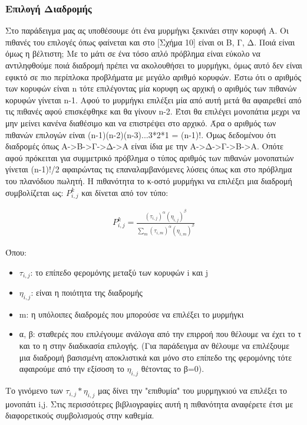 \subsubsection{Επιλογή Διαδρομής}
Στο παράδειγμα μας ας υποθέσουμε ότι ένα μυρμήγκι ξεκινάει στην κορυφή Α. Οι πιθανές του επιλογές όπως φαίνεται και στο [Σχήμα 10] είναι οι Β, Γ, Δ. Ποιά είναι όμως η βέλτιστη; 
Με το μάτι σε ένα τόσο απλό πρόβλημα είναι εύκολο να αντιληφθούμε ποιά διαδρομή πρέπει να ακολουθήσει το μυρμήγκι, όμως αυτό δεν είναι εφικτό σε πιο περίπλοκα προβλήματα με μεγάλο αριθμό κορυφών. Έστω ότι ο αριθμός των κορυφών είναι n τότε επιλέγοντας μία κορυφη ως αρχική ο αριθμός των πιθανών κορυφών γίνεται n-1. Αφού το μυρμήγκι επιλέξει μία από αυτή μετά θα αφαιρεθεί από τις πιθανές αφού επισκέφθηκε και θα γίνουν n-2. Έτσι θα επιλέγει μονοπάτια μεχρι να μην μείνει κανένα διαθέσιμο και να επιστρέψει στο αρχικό. Άρα ο αριθμός των πιθανών επιλογών είναι (n-1)(n-2)(n-3)...3*2*1 = (n-1)!. Όμως δεδομένου ότι διαδρομές όπως Α->Β->Γ->Δ->Α είναι ίδια με την Α->Δ->Γ->Β->Α. Οπότε αφού πρόκειται για συμμετρικό πρόβλημα ο τύπος αριθμός των πιθανών μονοπατιών γίνεται (n-1)!/2 αφαιρώντας τις επαναλαμβανόμενες λύσεις όπως και στο πρόβλημα του πλανόδιου πωλητή. 
Η πιθανότητα το κ-οστό μυρμήγκι να επιλέξει μια διαδρομή συμβολίζεται ως: $P^k_{i,j}$ και δίνεται από τον τύπο: \cite{CPVBK}

\begin{align}
	P^k_{i,j}=\frac{(τ_{i,j})^α(η_{i,j})^β}{\sum_{m}(τ_{i,m})^α(η_{i,m})^β}
\end{align}

Όπου: 
\begin{itemize}
    \item $τ_{i,j}$: το επίπεδο φερομόνης μεταξύ των κορυφών i και j
    \item $η_{i,j}$: είναι η ποιότητα της διαδρομής
    \item m: η υπόλοιπες διαδρομές που μπορούσε να επιλέξει το μυρμήγκι
    \item α, β: σταθερές που επιλέγουμε ανάλογα από την επιρροή που θέλουμε να έχει το τ και το η στην διαδικασία επιλογής. (Για παράδειγμα αν θέλουμε να επιλέξουμε μια διαδρομή βασισμένη αποκλιστικά και μόνο στο επίπεδο της φερομόνης τότε αφαιρούμε από την εξίσοση το $η_{i,j}$ θέτοντας το β=0).
\end{itemize}
Το γινόμενο των $τ_{i,j}*η_{i,j}$ μας δίνει την "επιθυμία" του μυρμηγκιού να επιλέξει το μονοπάτι i,j.
Στις περισσότερες βιβλιογραφίες αυτή η πιθανότητα αναφέρετε έτσι με διαφορετικούς συμβολισμούς στην καθεμία. 


